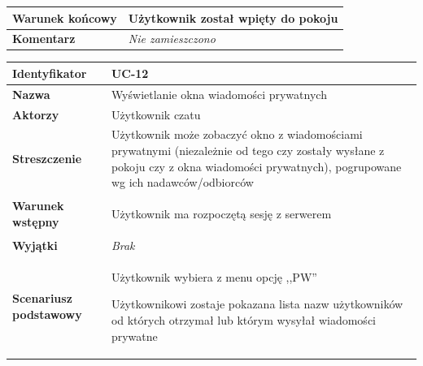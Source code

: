{\begin{tabular}{ | l | l | }
	\hline
		\parbox[t]{4cm}{\textbf{Warunek końcowy}} & \parbox[t]{11cm}{
			Użytkownik został wpięty do pokoju
		}
		\\
		
	\hline
		\parbox[t]{4cm}{\textbf{Komentarz}} & \parbox[t]{11cm}{
			\textit{Nie zamieszczono}
		}
		\\

	\hline
\end{tabular}

\vspace{2em}

\begin{tabular}{ | l | l | }
	\hline
		\textbf{Identyfikator} & 
		UC-12
		\\
		
	\hline
		\textbf{Nazwa} & 
		Wyświetlanie okna wiadomości prywatnych
		\\
		
	\hline
		\textbf{Aktorzy} & \parbox[t]{11cm}{
			Użytkownik czatu
		}\\
		 
	\hline
		\parbox[t]{4cm}{\textbf{Streszczenie}} & \parbox[t]{11cm}{
			Użytkownik może zobaczyć okno z wiadomościami prywatnymi
			(niezależnie od tego czy zostały wysłane z pokoju czy z okna
			wiadomości prywatnych), pogrupowane wg ich nadawców/odbiorców
			
		}\\
		
	\hline
		\parbox[t]{4cm}{\textbf{Warunek wstępny}} & \parbox[t]{11cm}{
			\begin{enumreq}
				\item Użytkownik ma rozpoczętą sesję z serwerem
			\end{enumreq}
				
		}
		\\
		
	\hline
		\parbox[t]{4cm}{\textbf{Wyjątki}} & \parbox[t]{11cm}{
			\textit{Brak}
			
		}
		\\

	\hline
		\parbox[t]{4cm}{\textbf{Scenariusz podstawowy}} & \parbox[t]{11cm}{
			\begin{enumreq}
				\item Użytkownik wybiera z menu opcję ,,PW''
				\item Użytkownikowi zostaje pokazana lista nazw użytkowników
				od których otrzymał lub którym wysyłał wiadomości prywatne
			\end{enumreq}
		}
		\\
		

\end{tabular}}
